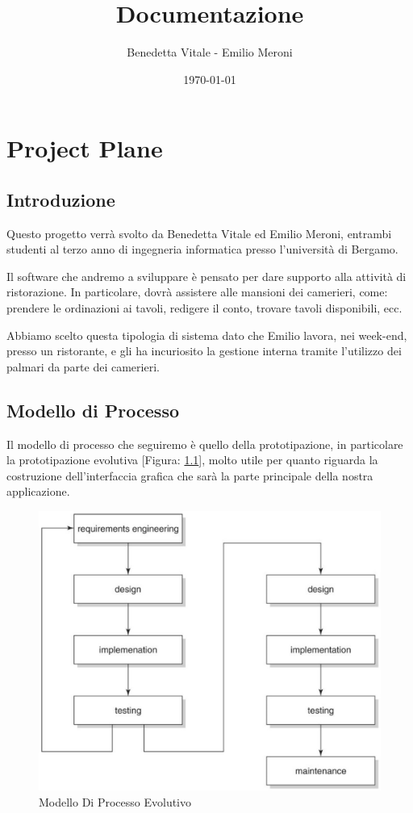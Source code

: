 \documentclass{book}
\title{Documentazione}
\author{Benedetta Vitale - Emilio Meroni}
\date{\today}
\begin{document}
\maketitle

\tableofcontents    

\chapter{Project Plane}

\section{Introduzione}

Questo progetto verrà svolto da Benedetta Vitale ed Emilio Meroni, 
entrambi studenti al terzo anno di ingegneria informatica presso 
l'università di Bergamo.

Il software che andremo a sviluppare è pensato per dare supporto 
alla attività di ristorazione. In particolare, dovrà assistere alle mansioni dei camerieri, come: prendere le ordinazioni ai tavoli, redigere il conto, trovare tavoli disponibili, ecc.

Abbiamo scelto questa tipologia di sistema dato che Emilio lavora, nei week-end, presso un ristorante, e gli ha incuriosito la gestione interna tramite l'utilizzo dei palmari da parte dei camerieri. 

\section{Modello di Processo}

Il modello di processo che seguiremo è quello della prototipazione, in particolare la prototipazione evolutiva [Figura: \ref{fig: modello_processo_evolutivo}], molto utile per quanto riguarda la costruzione dell'interfaccia grafica che sarà la parte principale della nostra applicazione.

\begin{figure}
    \centering
    \includegraphics[width = 0.7\linewidth]{../../Immagini/Modello_Processo_Evolutivo.jpg}
    \caption{Modello Di Processo Evolutivo}
    \label{fig: modello_processo_evolutivo}
    
\end{figure}
\end{document}
